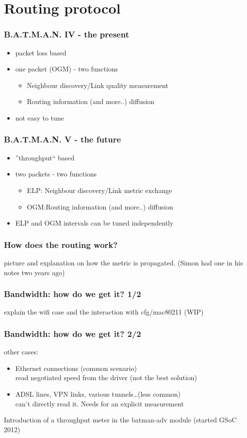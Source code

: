 \documentclass[slidestop]{beamer}
\begin{document}
\section{Routing protocol}
\begin{frame}[c]
	\frametitle{B.A.T.M.A.N. IV - the present}
	\begin{itemize}
		\item packet loss based
		\item one packet (OGM) - two functions
			\begin{itemize}
				\item Neighbour discovery/Link quality
					measurement
				\item Routing information (and more..) diffusion
			\end{itemize}
		\item not easy to tune
	\end{itemize}
\end{frame}

\begin{frame}[c]
	\frametitle{B.A.T.M.A.N. V - the future}
	\begin{itemize}
		\item ''throughput`` based
		\item two packets - two functions
			\begin{itemize}
				\item ELP: Neighbour discovery/Link metric
					exchange
				\item OGM:Routing information (and more..) diffusion
			\end{itemize}
		\item ELP and OGM intervals can be tuned independently
	\end{itemize}
	\begin{figure}
		\centering
	\end{figure}
\end{frame}

\begin{frame}[c]
	\frametitle{How does the routing work?}
	picture and explanation on how the metric is propagated. (Simon had one
	in his notes two years ago)
\end{frame}

\begin{frame}[c]
	\frametitle{Bandwidth: how do we get it? 1/2}
	explain the wifi case and the interaction with cfg/mac80211 (WIP)
\end{frame}

\begin{frame}[c]
	\frametitle{Bandwidth: how do we get it? 2/2}
	other cases:
	\begin{itemize}
		\item Ethernet connections (common scenario)\\
			read negotiated speed from the driver (not the best
			solution)
		\pause
		\item ADSL lines, VPN links, various tunnels\dots (less
			common)\\
			can't directly read it. Needs for an explicit
			measurement
	\end{itemize}
	\pause
	Introduction of a throughput meter in the batman-adv module (started
	GSoC 2012)
\end{frame}
\end{document}
